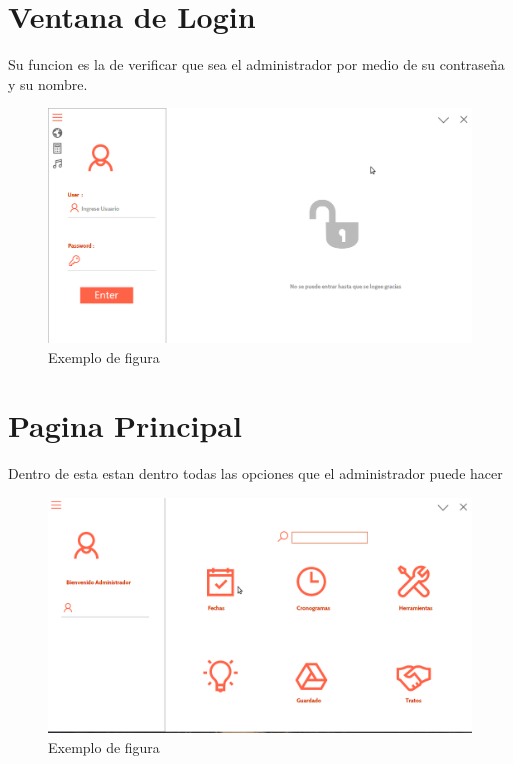 \documentclass[10pt,a4paper]{report}
\begin{document}
\begin{titlepage}
\begin{flushleft}

 \vspace{.5cm}
\section{Ventana de Login}
Su funcion es la de verificar que sea el administrador por medio de su contraseña y su nombre.
\begin{figure}[ht]
\centering
\includegraphics[width=1\textwidth]{loginRestaurante1.png} 
\caption{Exemplo de figura}
\label{fig:figura1}
\end{figure}

\section{Pagina Principal}
Dentro de esta estan dentro todas las opciones que el administrador puede hacer 
\begin{figure}[ht]
\centering
\includegraphics[width=1\textwidth]{indexrestaunrante1.png}

\caption{Exemplo de figura}
\label{fig:figura1}
\end{figure}
	
\vspace{1cm}

\end{flushleft} 
\end{titlepage}
\end{document}
